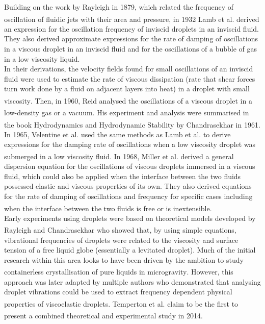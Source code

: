 \documentclass{physics_article_B}
\begin{document}
Building on the work by Rayleigh in 1879, which related the frequency of oscillation of fluidic jets with their area and pressure\textsuperscript{\cite{rayleigh}}, in 1932 Lamb et al. derived an expression for the oscillation frequency of inviscid droplets in an inviscid fluid. They also derived approximate expressions for the rate of damping of oscillations in a viscous droplet in an inviscid fluid and for the oscillations of a bubble of gas in a low viscosity liquid. \\

In their derivations, the velocity fields found for small oscillations of an inviscid fluid were used to estimate the rate of viscous dissipation (rate that shear forces turn work done by a fluid on adjacent layers into heat) in a droplet with small viscosity\textsuperscript{\cite{lamb}}. Then, in 1960, Reid analysed the oscillations of a viscous droplet in a low-density gas or a vacuum\textsuperscript{\cite{reid}}. His experiment and analysis were summarised in the book Hydrodynamics and Hydrodynamic Stability by Chandrasekhar in 1961\textsuperscript{\cite{chandrasekhar}}. In 1965, Velentine et al. used the same methods as Lamb et al. to derive expressions for the damping rate of oscillations when a low viscosity droplet was submerged in a low viscosity fluid\textsuperscript{\cite{velentine}}. In 1968, Miller et al. derived a general dispersion equation for the oscillations of viscous droplets immersed in a viscous fluid, which could also be applied when the interface between the two fluids possessed elastic and viscous properties of its own. They also derived equations for the  rate of damping of oscillations and frequency for specific cases including when the interface between the two fluids is free or is inextensible\textsuperscript{\cite{miller}}.\\

Early experiments using droplets were based on theoretical models developed by Rayleigh\textsuperscript{\cite{rayleigh}} and Chandrasekhar\textsuperscript{\cite{chandrasekhar2}} who showed that, by using simple equations, vibrational frequencies of droplets were related to the viscosity and surface tension of a free liquid globe (essentially a levitated droplet). Much of the initial research within this area looks to have been driven by the ambition to study containerless crystallisation of pure liquids in microgravity\textsuperscript{\cite{wilkes}}. However, this approach was later adapted by multiple authors who demonstrated that analysing droplet vibrations could be used to extract frequency dependent physical properties of viscoelastic droplets\textsuperscript{\cite{egry}}. Temperton et al. claim to be the first to present a combined theoretical and experimental study in 2014\textsuperscript{\cite{temperton}}.
\end{document}

